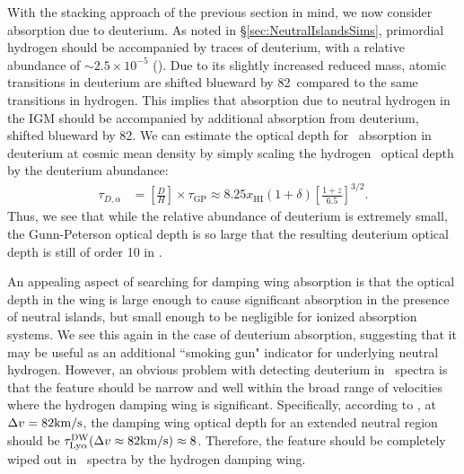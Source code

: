 With the stacking approach of the previous section in mind, we now consider absorption due to deuterium. As noted in \S\ref{sec:NeutralIslandsSims}, primordial hydrogen should be accompanied by traces of deuterium, with a relative abundance of $\sim 2.5\times 10^{-5}$ (\citealt{Cooke:2013cba}). Due to its slightly increased reduced mass, atomic transitions in deuterium are shifted blueward by 82\kms\ compared to the same transitions in hydrogen. This implies that absorption due to neutral hydrogen in the IGM should be accompanied by additional absorption from deuterium, shifted blueward by 82\kms. We can estimate the optical depth for \lya\ absorption in deuterium at cosmic mean density by simply scaling the hydrogen \lya\ optical depth by the deuterium abundance:
\begin{align}
\tau_{D,\alpha} &= \left[ \frac{D}{H} \right]  \times \tau_{\text{GP}} \approx 8.25 x_{\text{HI}} \left(1+\delta\right)  \left[ \frac{1+z}{6.5} \right]^{3/2}.
\end{align}
Thus, we see that while the relative abundance of deuterium is extremely small, the Gunn-Peterson optical depth is so large that the resulting deuterium optical depth is still of order 10 in \lya.


An appealing aspect of searching for damping wing absorption is that the optical depth in the wing is large enough to cause significant absorption in the presence of neutral islands, but small enough to be negligible for ionized absorption systems. We see this again in the case of deuterium absorption, suggesting that it may be useful as an additional ``smoking gun" indicator for underlying neutral hydrogen. However, an obvious problem with detecting deuterium in \lya\ spectra is that the feature should be narrow and well within the broad range of velocities where the hydrogen damping wing is significant. Specifically, according to , at $\Delta v = 82\text{km}/\text{s}$, the damping wing optical depth for an extended neutral region should be $\tau_{\text{Ly}\alpha}^{\text{DW}}(\Delta v \approx 82\text{km}/\text{s}) \approx 8$. Therefore, the feature should be completely wiped out in \lya\ spectra by the hydrogen damping wing.


